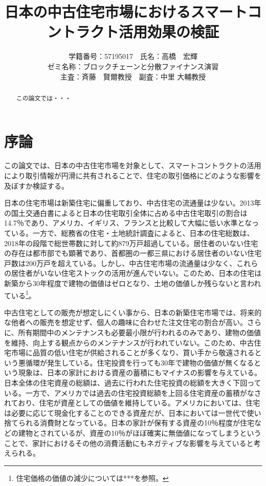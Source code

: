 \documentclass[a4paper,11pt]{jlreq}
\title{日本の中古住宅市場におけるスマートコントラクト活用効果の検証}
\author{
学籍番号：57195017　氏名：高橋　宏輝
\\ゼミ名称：ブロックチェーンと分散ファイナンス演習
\\主査：斉藤　賢爾教授　副査：中里 大輔教授}
\begin{document}
\date{}
\maketitle
\begin{abstract}
この論文では・・・
\end{abstract}

\newpage
\tableofcontents

\newpage
\section{序論}
この論文では、日本の中古住宅市場を対象として、スマートコントラクトの活用により取引情報が円滑に共有されることで、住宅の取引価格にどのような影響を及ぼすか検証する。

日本の住宅市場は新築住宅に偏重しており、中古住宅の流通量は少ない。2013年の国土交通白書によると日本の住宅取引全体に占める中古住宅取引の割合は14.7％であり、アメリカ、イギリス、フランスと比較して大幅に低い水準となっている。一方で、総務省の住宅・土地統計調査によると、日本の住宅総数は、2018年の段階で総世帯数に対して約879万戸超過している。居住者のいない住宅の存在は都市部でも顕著であり、首都圏の一都三県における居住者のいない住宅戸数は200万戸を超えている。しかし、中古住宅市場の流通量は少なく、これらの居住者がいない住宅ストックの活用が進んでいない。このため、日本の住宅は新築から30年程度で建物の価値はゼロとなり、土地の価値しか残らないと言われている\footnote{住宅価格の価値の減少については***を参照。}。

中古住宅としての販売が想定しにくい事から、日本の新築住宅市場では、将来的な他者への販売を想定せず、個人の趣味に合わせた注文住宅の割合が高い。さらに、所有期間中のメンテナンスも必要最小限が行われるのみであり、建物の価値を維持、向上する観点からのメンテナンスが行われていない。このため、中古住宅市場に品質の低い住宅が供給されることが多くなり、買い手から敬遠されるという悪循環が発生している。住宅投資を行っても30年で建物の価値が無くなるという現象は、日本の家計における資産の蓄積にもマイナスの影響を与えている。
日本全体の住宅資産の総額は、過去に行われた住宅投資の総額を大きく下回っている。一方で、アメリカでは過去の住宅投資総額を上回る住宅資産の蓄積がなされており、住宅が資産としての価値を維持している。アメリカにおいては、住宅は必要に応じて現金化することのできる資産だが、日本においては一世代で使い捨てられる消費財となっている。日本の家計が保有する資産の10％程度が住宅などの建物とされているが、資産の10％がほぼ確実に無価値になってしまうということで、家計におけるその他の消費活動にもネガティブな影響を与えていると考えられる。
\end{document}
